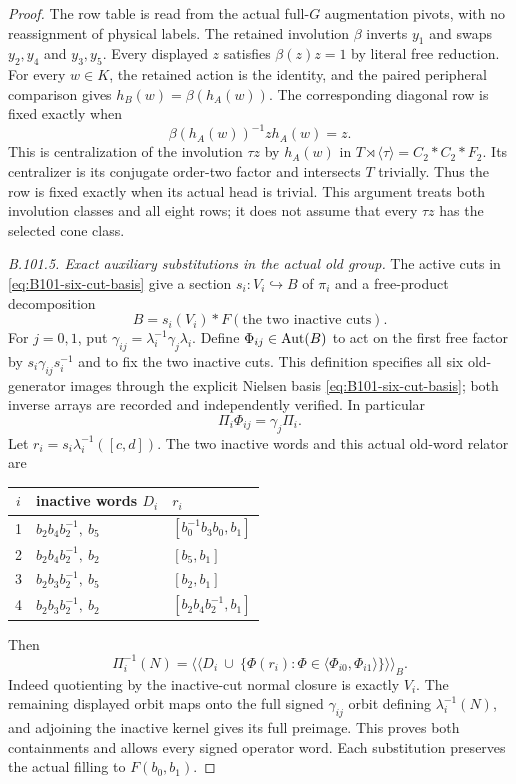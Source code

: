\begin{proof}
The row table is read from the actual full-$G$ augmentation pivots,
with no reassignment of physical labels.
The retained involution $\beta$ inverts $y_1$ and swaps
$y_2,y_4$ and $y_3,y_5$.
Every displayed $z$ satisfies $\beta(z)z=1$ by literal free reduction.
For every $w\in K$, the retained action is the identity, and the
paired peripheral comparison gives $h_B(w)=\beta(h_A(w))$.
The corresponding diagonal row is fixed exactly when
\[
 \beta(h_A(w))^{-1}z h_A(w)=z.
\]
This is centralization of the involution $\tau z$ by $h_A(w)$ in
$T\rtimes\langle\tau\rangle=C_2*C_2*F_2$.
Its centralizer is its conjugate order-two factor and intersects
$T$ trivially.  Thus the row is fixed exactly when its actual head
is trivial.  This argument treats both involution classes and all
eight rows; it does not assume that every $\tau z$ has the selected
cone class.

\emph{B.101.5. Exact auxiliary substitutions in the actual old group.}
The active cuts in \eqref{eq:B101-six-cut-basis} give a section
$s_i:V_i\hookrightarrow B$ of $\pi_i$ and a free-product decomposition
\[
 B=s_i(V_i)*F(\text{the two inactive cuts}).
\]
For $j=0,1$, put
$\gamma_{ij}=\lambda_i^{-1}\gamma_j\lambda_i$.
Define $\Phi_{ij}\in\operatorname{Aut}(B)$ to act on the first free factor by
$s_i\gamma_{ij}s_i^{-1}$ and to fix the two inactive cuts.
This definition specifies all six old-generator images through the
explicit Nielsen basis \eqref{eq:B101-six-cut-basis}; both inverse
arrays are recorded and independently verified.
In particular
\begin{equation}\label{eq:B101-substitution-diagram}
 \Pi_i\Phi_{ij}=\gamma_j\Pi_i.
\end{equation}
Let $r_i=s_i\lambda_i^{-1}([c,d])$.
The two inactive words and this actual old-word relator are
\begin{center}
\begin{tabular}{c@{\quad}ll}
\toprule
$i$&inactive words $D_i$&$r_i$\\
\midrule
1&$b_2b_4b_2^{-1},\ b_5$&$[b_0^{-1}b_3b_0,b_1]$\\
2&$b_2b_4b_2^{-1},\ b_2$&$[b_5,b_1]$\\
3&$b_2b_3b_2^{-1},\ b_5$&$[b_2,b_1]$\\
4&$b_2b_3b_2^{-1},\ b_2$&$[b_2b_4b_2^{-1},b_1]$\\
\bottomrule
\end{tabular}
\end{center}
Then
\begin{equation}\label{eq:B101-substitution-kernel}
 \Pi_i^{-1}(N)=
 \big\langle\!\big\langle
 D_i\ \cup\ \{\Phi(r_i):\Phi\in
                    \langle\Phi_{i0},\Phi_{i1}\rangle\}
 \big\rangle\!\big\rangle_B.
\end{equation}
Indeed quotienting by the inactive-cut normal closure is exactly
$V_i$.  The remaining displayed orbit maps onto the full signed
$\gamma_{ij}$ orbit defining $\lambda_i^{-1}(N)$, and adjoining
the inactive kernel gives its full preimage.  This proves both
containments and allows every signed operator word.
Each substitution preserves the actual filling to $F(b_0,b_1)$.


\end{proof}

